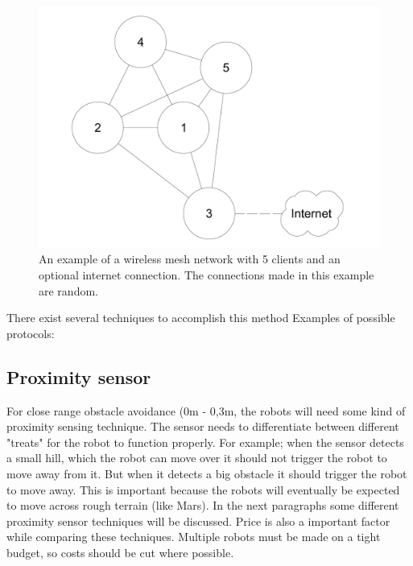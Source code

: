 \documentclass[10pt,a4paper]{article}
\begin{document}
\begin{figure}[H]
   \centering
   \includegraphics[width=1\textwidth]{WMN}
   \caption{An example of a wireless mesh network with 5 clients and an optional internet connection. The connections made in this example are random.}
   \label{fig:WMN}
\end{figure}




There exist several techniques to accomplish this method 
Examples of possible protocols:


\newpage


\subsection{Proximity sensor}

For close range obstacle avoidance (0m - 0,3m, the robots will need some kind of proximity sensing technique. The sensor needs to differentiate between different "treats" for the robot to function properly. For example; when the sensor detects a small hill, which the robot can move over it should not trigger the robot to move away from it. But when it detects a big obstacle it should trigger the robot to move away. This is important because the robots will eventually be expected to move across rough terrain (like Mars). In the next paragraphs some different proximity sensor techniques will be discussed. Price is also a important factor while comparing these techniques. Multiple robots must be made on a tight budget, so costs should be cut where possible.\\
\end{document}
